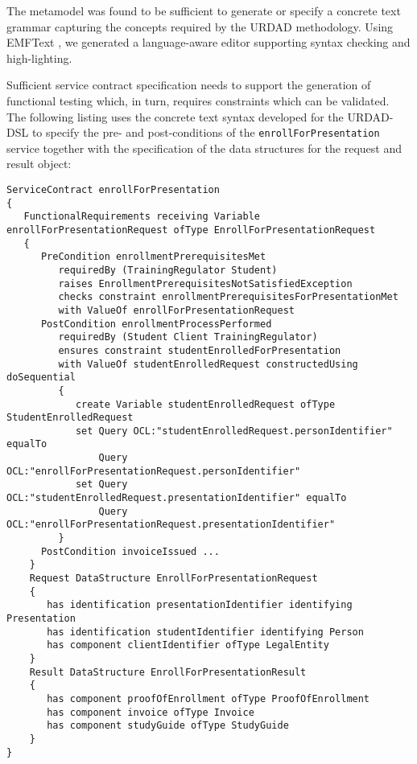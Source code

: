 The metamodel was found to be sufficient to generate or specify a concrete text grammar capturing the concepts required by the URDAD methodology. Using EMFText \cite{heidenreich_derivation_2009}, we generated a language-aware editor supporting syntax checking and high-lighting.

Sufficient service contract specification needs to support the generation of functional testing which, in turn, requires constraints which can be validated. The following listing uses the concrete text syntax developed for the URDAD-DSL to specify the pre- and post-conditions of the \verb+enrollForPresentation+ service together with the specification of the data structures for the request and result object:
\tiny{\begin{verbatim}
ServiceContract enrollForPresentation
{
   FunctionalRequirements receiving Variable enrollForPresentationRequest ofType EnrollForPresentationRequest
   {
      PreCondition enrollmentPrerequisitesMet
         requiredBy (TrainingRegulator Student) 
         raises EnrollmentPrerequisitesNotSatisfiedException
         checks constraint enrollmentPrerequisitesForPresentationMet
         with ValueOf enrollForPresentationRequest
      PostCondition enrollmentProcessPerformed
         requiredBy (Student Client TrainingRegulator)
         ensures constraint studentEnrolledForPresentation 
         with ValueOf studentEnrolledRequest constructedUsing doSequential
         {
            create Variable studentEnrolledRequest ofType StudentEnrolledRequest
            set Query OCL:"studentEnrolledRequest.personIdentifier" equalTo
                Query OCL:"enrollForPresentationRequest.personIdentifier"                            
            set Query OCL:"studentEnrolledRequest.presentationIdentifier" equalTo
                Query OCL:"enrollForPresentationRequest.presentationIdentifier"                            
         }  
      PostCondition invoiceIssued ...
    }            
    Request DataStructure EnrollForPresentationRequest 
    {
       has identification presentationIdentifier identifying Presentation
       has identification studentIdentifier identifying Person
       has component clientIdentifier ofType LegalEntity         
    }
    Result DataStructure EnrollForPresentationResult 
    {
       has component proofOfEnrollment ofType ProofOfEnrollment
       has component invoice ofType Invoice
       has component studyGuide ofType StudyGuide
    }
}
\end{verbatim}}
\normalsize

